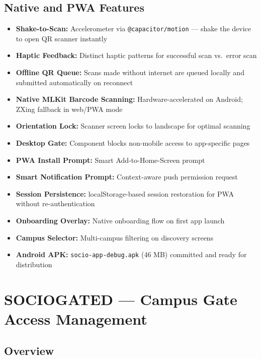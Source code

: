 \documentclass[12pt,a4paper]{article}
\begin{document}
\subsection{Native and PWA Features}

\begin{itemize}[leftmargin=*]
    \item \textbf{Shake-to-Scan:} Accelerometer via \texttt{@capacitor/motion} — shake the device to open QR scanner instantly
    \item \textbf{Haptic Feedback:} Distinct haptic patterns for successful scan vs.\ error scan
    \item \textbf{Offline QR Queue:} Scans made without internet are queued locally and submitted automatically on reconnect
    \item \textbf{Native MLKit Barcode Scanning:} Hardware-accelerated on Android; ZXing fallback in web/PWA mode
    \item \textbf{Orientation Lock:} Scanner screen locks to landscape for optimal scanning
    \item \textbf{Desktop Gate:} Component blocks non-mobile access to app-specific pages
    \item \textbf{PWA Install Prompt:} Smart Add-to-Home-Screen prompt
    \item \textbf{Smart Notification Prompt:} Context-aware push permission request
    \item \textbf{Session Persistence:} localStorage-based session restoration for PWA without re-authentication
    \item \textbf{Onboarding Overlay:} Native onboarding flow on first app launch
    \item \textbf{Campus Selector:} Multi-campus filtering on discovery screens
    \item \textbf{Android APK:} \texttt{socio-app-debug.apk} (46 MB) committed and ready for distribution
\end{itemize}

\newpage
\section{SOCIOGATED — Campus Gate Access Management}

\subsection{Overview}
\end{document}
